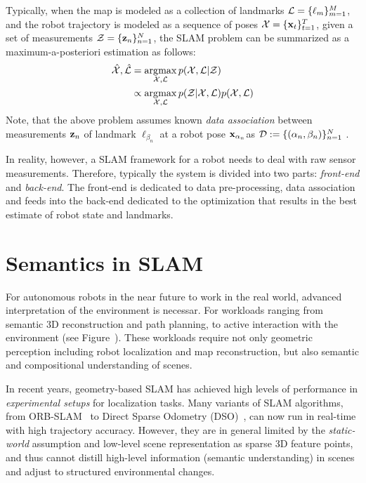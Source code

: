 Typically, when the map is modeled as a collection of landmarks $ \mathcal{L} = \{\ell_m\}_{m=1}^{M} $, and the robot trajectory is modeled as a sequence of poses $\mathcal{X} = \{\mathbf{x}_t\}_{t=1}^{T}$, given a set of measurements $ \mathcal{Z} = \{\mathbf{z}_n\}_{n=1}^{N}$, the SLAM problem can be summarized as a maximum-a-posteriori estimation \cite{dellaertFactorGraphsRobot2017} as follows:
\begin{align}
    \hat{\mathcal{X}}, \hat{\mathcal{L}} &= \operatorname*{\arg\!\max}_{\mathcal{X}, \mathcal{L}} p(\mathcal{X}, \mathcal{L} | \mathcal{Z}) \\
                         &\propto \operatorname*{\arg\!\max}_{\mathcal{X}, \mathcal{L}} p(\mathcal{Z} | \mathcal{X}, \mathcal{L}) p(\mathcal{X}, \mathcal{L})
\end{align}
Note, that the above problem assumes known \emph{data association} between measurements $\mathbf{z}_n$ of landmark $\ell_{\beta_n}$ at a robot pose $\mathbf{x}_{\alpha_n}$as $\mathcal{D} := \{(\alpha_n, \beta_n)\}_{n=1}^{N}$ \cite{bowmanProbabilisticDataAssociation2017}.

In reality, however, a SLAM framework for a robot needs to deal with raw sensor measurements. Therefore, typically the system is divided into two parts: \emph{front-end} and \emph{back-end}. The front-end is dedicated to data pre-processing, data association and feeds into the back-end dedicated to the optimization that results in the best estimate of robot state and landmarks.

\section{Semantics in SLAM}

For autonomous robots in the near future to work in the real world, advanced interpretation of the environment is necessar. For workloads ranging from semantic 3D reconstruction and path planning, to active interaction with the environment (see Figure~). These workloads require not only geometric perception including robot localization and map reconstruction, but also semantic and compositional understanding of scenes.

In recent years, geometry-based SLAM has achieved high levels of performance in \textit{experimental setups} for localization tasks. Many variants of SLAM algorithms, from ORB-SLAM~\cite{mur-artalORBSLAM2OpenSourceSLAM2017} to Direct Sparse Odometry (DSO)~\cite{engelDirectSparseOdometry2018}, can now run in real-time with high trajectory accuracy.
However, they are in general limited by the \emph{static-world} assumption and low-level scene representation as sparse 3D feature points, and thus cannot distill high-level information (semantic understanding) in scenes and adjust to structured environmental changes.

